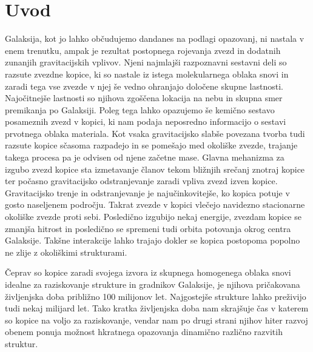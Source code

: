 
\section{Uvod}
\label{sec:slo_uvod}
Galaksija, kot jo lahko občudujemo dandanes na podlagi opazovanj, ni nastala v enem trenutku, ampak je rezultat postopnega rojevanja zvezd in dodatnih zunanjih gravitacijskih vplivov. Njeni najmlajši razpoznavni sestavni deli so razsute zvezdne kopice, ki so nastale iz istega molekularnega oblaka snovi in zaradi tega vse zvezde v njej še vedno ohranjajo določene skupne lastnosti. Najočitnejše lastnosti so njihova zgoščena lokacija na nebu in skupna smer premikanja po Galaksiji. Poleg tega lahko opazujemo še kemično sestavo posameznih zvezd v kopici, ki nam podaja neposredno informacijo o sestavi prvotnega oblaka materiala. Kot vsaka gravitacijsko slabše povezana tvorba tudi razsute kopice sčasoma razpadejo in se pomešajo med okoliške zvezde, trajanje takega procesa pa je odvisen od njene začetne mase. Glavna mehanizma za izgubo zvezd kopice sta izmetavanje članov tekom bližnjih srečanj znotraj kopice ter počasno gravitacijsko odstranjevanje zaradi vpliva zvezd izven kopice. Gravitacijsko trenje in odstranjevanje je najučinkovitejše, ko kopica potuje v gosto naseljenem področju. Takrat zvezde v kopici vlečejo navidezno stacionarne okoliške zvezde proti sebi. Posledično izgubijo nekaj energije, zvezdam kopice se zmanjša hitrost in posledično se spremeni tudi orbita potovanja okrog centra Galaksije. Takšne interakcije lahko trajajo dokler se kopica postopoma popolno ne zlije z okoliškimi strukturami.

Čeprav so kopice zaradi svojega izvora iz skupnega homogenega oblaka snovi idealne za raziskovanje strukture in gradnikov Galaksije, je njihova pričakovana življenjska doba približno 100 milijonov let. Najgostejše strukture lahko preživijo tudi nekaj milijard let. Tako kratka življenjska doba nam skrajšuje čas v katerem so kopice na voljo za raziskovanje, vendar nam po drugi strani njihov hiter razvoj obenem ponuja možnost hkratnega opazovanja dinamično različno razvitih struktur.

